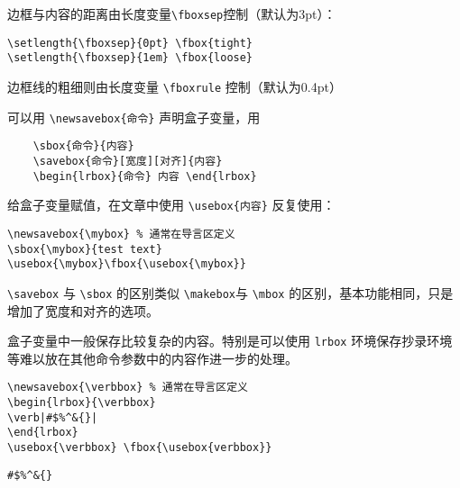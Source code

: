边框与内容的距离由长度变量\verb|\fboxsep|控制（默认为3pt）：

\begin{minipage}[t]{0.45\textwidth}
\begin{lstlisting}
\setlength{\fboxsep}{0pt} \fbox{tight}
\setlength{\fboxsep}{1em} \fbox{loose}
\end{lstlisting}
\end{minipage}
\hfill
\begin{minipage}[t]{0.45\textwidth}
    \setlength{\fboxsep}{0pt} 
    \setlength{\fboxsep}{1em} 
\end{minipage}

边框线的粗细则由长度变量 \verb|\fboxrule| 控制（默认为0.4pt）

可以用 \verb|\newsavebox{命令}| 声明盒子变量，用

\begin{lstlisting}
    \sbox{命令}{内容}
    \savebox{命令}[宽度][对齐]{内容}
    \begin{lrbox}{命令} 内容 \end{lrbox}
\end{lstlisting}

给盒子变量赋值，在文章中使用 \verb|\usebox{内容}| 反复使用：

\begin{minipage}[t]{0.45\textwidth}
\begin{lstlisting}
\newsavebox{\mybox} % 通常在导言区定义
\sbox{\mybox}{test text}
\usebox{\mybox}\fbox{\usebox{\mybox}}
\end{lstlisting}
\end{minipage}
\hfill
\begin{minipage}[t]{0.45\textwidth}
    \newsavebox{\mybox} 
    \usebox{\mybox} \fbox{\usebox{\mybox}}
\end{minipage}

\verb|\savebox| 与 \verb|\sbox| 的区别类似 \verb|\makebox|与 \verb|\mbox| 的区别，基本功能相同，只是增加了宽度和对齐的选项。

盒子变量中一般保存比较复杂的内容。特别是可以使用 \verb|lrbox| 环境保存抄录环境等难以放在其他命令参数中的内容作进一步的处理。

\begin{minipage}[t]{0.45\textwidth}
\begin{lstlisting}
\newsavebox{\verbbox} % 通常在导言区定义
\begin{lrbox}{\verbbox}
\verb|#$%^&{}|
\end{lrbox}
\usebox{\verbbox} \fbox{\usebox{verbbox}}
\end{lstlisting}
\end{minipage}
\hfill
\begin{minipage}[t]{0.45\textwidth}
    \newsavebox{\verbbox}
    \begin{lrbox}{\verbbox}
    \verb|#$%
    \end{lrbox}
    \usebox{\verbbox} \fbox{\usebox{\verbbox}}
\end{minipage}

